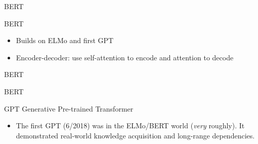 \documentclass[t,aspectratio=169]{beamer}
\begin{document}
\begin{frame}{BERT}
\end{frame}

\begin{frame}{BERT}
  \begin{itemize}
  \item Builds on ELMo and first GPT
  \item Encoder-decoder: use self-attention to encode and attention to decode
  \end{itemize}


\end{frame}

\begin{frame}{BERT}
\end{frame}

\begin{frame}{BERT}
\end{frame}

\begin{frame}{GPT}
  Generative Pre-trained Transformer

  \begin{itemize}
  \item The first GPT (6/2018) was in the ELMo/BERT world (\textit{very}
    roughly).  It demonstrated real-world knowledge acquisition and
    long-range dependencies.
  \end{itemize}
\end{frame}


\begin{frame}
\end{frame}
\end{document}
